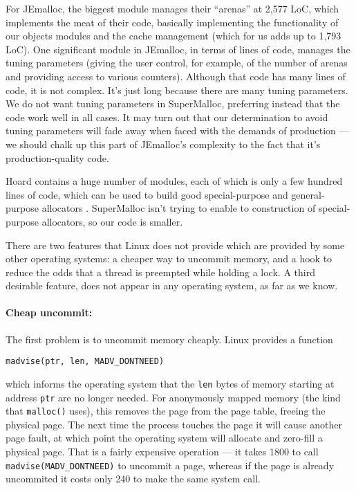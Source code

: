 \documentclass[pldi]{sigplanconf-pldi15}
\newcommand{\code}[1]{\texttt{#1}}
\newcommand{\ns}[1]{\unit{#1}\nano\second{}}
\begin{document}
For JEmalloc, the biggest module manages their ``arenas'' at 2,577
LoC, which implements the meat of their code, basically implementing
the functionality of our objects modules and the cache management
(which for us adds up to 1,793 LoC).  One significant module in
JEmalloc, in terms of lines of code, manages the tuning parameters
(giving the user control, for example, of the number of arenas and
providing access to various counters).  Although that code has many
lines of code, it is not complex.  It's just long because there are
many tuning parameters.  We do not want tuning parameters in
SuperMalloc, preferring instead that the code work well in all cases.
It may turn out that our determination to avoid tuning parameters will
fade away when faced with the demands of production --- we should
chalk up this part of JEmalloc's complexity to the fact that it's
production-quality code.

Hoard contains a huge number of modules, each of which is only a few
hundred lines of code, which can be used to build good special-purpose
and general-purpose allocators \cite{AlexandrescuBe05}.  SuperMalloc
isn't trying to enable to construction of special-purpose allocators,
so our code is smaller.


There are two features that Linux does not provide which are provided
by some other operating systems: a cheaper way to uncommit memory, and
a hook to reduce the odds that a thread is preempted while holding a
lock.  A third desirable feature,  does not
appear in any operating system, as far as we know.

{\paragraph{Cheap uncommit:}} The first problem is to uncommit memory
cheaply.  Linux provides a function
\begin{center}
\code{madvise(ptr, len, MADV_DONTNEED)}
\end{center}
which informs the operating system that the \code{len} bytes of memory
starting at address \code{ptr} are no longer needed.  For anonymously
mapped memory (the kind that \code{malloc()} uses), this removes the
page from the page table, freeing the physical page.  The next time
the process touches the page it will cause another page fault, at
which point the operating system will allocate and zero-fill a
physical page.  That is a fairly expensive operation --- it takes
\ns{1800} to call \code{madvise(MADV_DONTNEED)} to uncommit a page,
whereas if the page is already uncommited it costs only \ns{240} to
make the same system call.
\end{document}
